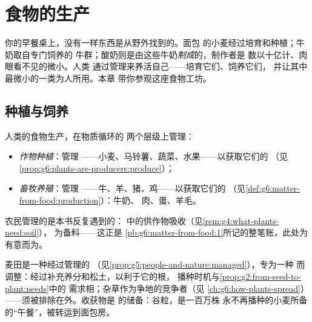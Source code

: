 \chapter{食物的生产}\label{ch:g6:producing-our-food}

你的早餐桌上，没有一样东西是从野外找到的。面包
的小麦经过培育和种植；牛奶取自专门饲养的
牛群；酸奶则是由这些牛奶\emph{制成}的，制作者是
数以十亿计、肉眼看不见的微小。人类
通过管理来养活自己——培育它们、饲养它们，
并让其中最微小的一类为人所用。本章
带你参观这座食物工坊。

\section{种植与饲养}

\begin{definition}[农作物与畜牧]\label{def:g6:producing-our-food:farming}
人类的食物生产，在物质循环的
两个层级上管理：
\begin{itemize}
  \item \emph{作物种植}：管理
——小麦、马铃薯、蔬菜、水果——以获取它们的
        （见\cref{prop:g6:plants-are-producers:produce}）；
  \item \emph{畜牧养殖}：管理
        ——牛、羊、猪、鸡——以获取它们的
        （见\cref{def:g6:matter-from-food:production}）：牛奶、
        肉、蛋、羊毛。
\end{itemize}
农民管理的是本书反复遇到的：
中的供作物吸收（见\cref{rem:g4:what-plants-need:soil}），
为备料——这正是
\cref{pb:g6:matter-from-food:1}所记的整笔账，此处为有意而为。
\end{definition}

\begin{example}[麦田是什么]\label{ex:g6:producing-our-food:wheat}
麦田是一种经过管理的
（见\cref{prop:g5:people-and-nature:managed}），专为一种
而调整：经过补充养分和松土，以利于它的根，
播种时机与\cref{prop:g2:from-seed-to-plant:needs}中的
需求相；杂草作为争地的竞争者（见
\cref{ch:g6:how-plants-spread}）——须被排除在外。收获物是
的储备：谷粒，是一百万株
永不再播种的小麦所备的“午餐”，被转运到面包房。
\end{example}

